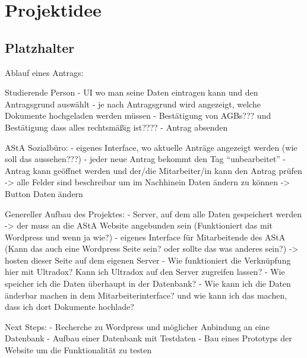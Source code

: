 
\chapter{Projektidee}\label{cha:Projektidee}

\section{Platzhalter}\label{sec:tbd}

Ablauf eines Antrags:

Studierende Person
- UI wo man seine Daten eintragen kann und den Antragsgrund auswählt
- je nach Antragsgrund wird angezeigt, welche Dokumente hochgeladen werden müssen 
- Bestätigung von AGBs??? und Bestätigung dass alles rechtsmäßig ist???? 
- Antrag absenden

AStA Sozialbüro: 
- eigenes Interface, wo aktuelle Anträge angezeigt werden (wie soll das aussehen???)
- jeder neue Antrag bekommt den Tag ``unbearbeitet''
- Antrag kann geöffnet werden und der/die Mitarbeiter/in kann den Antrag prüfen -> alle Felder sind beschreibar um im Nachhinein Daten ändern zu können -> Button Daten ändern


Genereller Aufbau des Projektes: 
- Server, auf dem alle Daten gespeichert werden -> der muss an die AStA Website angebunden sein (Funktioniert das mit Wordpress und wenn ja wie?)
- eigenes Interface für Mitarbeitende des AStA (Kann das auch eine Wordpress Seite sein? oder sollte das was anderes sein?) -> hosten dieser Seite auf dem eigenen Server
- Wie funktioniert die Verknüpfung hier mit Ultradox? Kann ich Ultradox auf den Server zugreifen lassen? 
- Wie speicher ich die Daten überhaupt in der Datenbank? 
- Wie kann ich die Daten änderbar machen in dem Mitarbeiterinterface? und wie kann ich das machen, dass ich dort Dokumente hochlade? 
 
Next Steps: 
- Recherche zu Wordpress und möglicher Anbindung an eine Datenbank 
- Aufbau einer Datenbank mit Testdaten
- Bau eines Prototyps der Website um die Funktionalität zu testen 